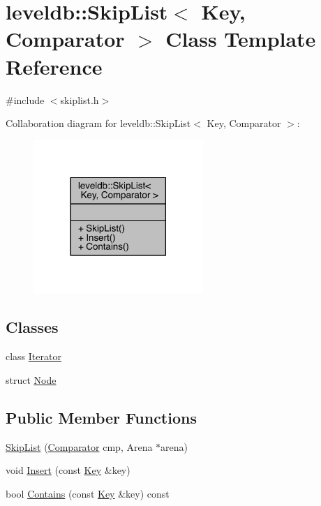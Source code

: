 \hypertarget{classleveldb_1_1_skip_list}{}\section{leveldb\+::Skip\+List$<$ Key, Comparator $>$ Class Template Reference}
\label{classleveldb_1_1_skip_list}


{\ttfamily \#include $<$skiplist.\+h$>$}



Collaboration diagram for leveldb\+::Skip\+List$<$ Key, Comparator $>$\+:
\nopagebreak
\begin{figure}[H]
\begin{center}
\leavevmode
\includegraphics[width=182pt]{classleveldb_1_1_skip_list__coll__graph}
\end{center}
\end{figure}
\subsection*{Classes}
\begin{DoxyCompactItemize}
\item 
class \mbox{\hyperlink{classleveldb_1_1_skip_list_1_1_iterator}{Iterator}}
\item 
struct \mbox{\hyperlink{structleveldb_1_1_skip_list_1_1_node}{Node}}
\end{DoxyCompactItemize}
\subsection*{Public Member Functions}
\begin{DoxyCompactItemize}
\item 
\mbox{\hyperlink{classleveldb_1_1_skip_list_a793060fb1b44b01c6f510aa16387c6ee}{Skip\+List}} (\mbox{\hyperlink{structleveldb_1_1_comparator}{Comparator}} cmp, Arena $\ast$arena)
\item 
void \mbox{\hyperlink{classleveldb_1_1_skip_list_af1ed755f0825f38272aafe3cae4da644}{Insert}} (const \mbox{\hyperlink{namespaceleveldb_a7e9a9725b13fa0bd922d885280dfab95}{Key}} \&key)
\item 
bool \mbox{\hyperlink{classleveldb_1_1_skip_list_a689b9724beb6c224c01cf1b9d8699e16}{Contains}} (const \mbox{\hyperlink{namespaceleveldb_a7e9a9725b13fa0bd922d885280dfab95}{Key}} \&key) const
\end{DoxyCompactItemize}


